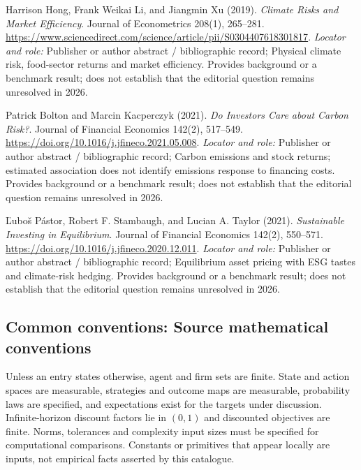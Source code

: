 \documentclass[11pt,a4paper]{article}
\begin{document}
\begin{enumerate}[label={[S\arabic*]},leftmargin=*]

\item Harrison Hong, Frank Weikai Li, and Jiangmin Xu (2019). \emph{Climate Risks and Market Efficiency}. Journal of Econometrics 208(1), 265–281. \url{https://www.sciencedirect.com/science/article/pii/S0304407618301817}.
\textit{Locator and role:} Publisher or author abstract / bibliographic record; Physical climate risk, food-sector returns and market efficiency. Provides background or a benchmark result; does not establish that the editorial question remains unresolved in 2026.

\item Patrick Bolton and Marcin Kacperczyk (2021). \emph{Do Investors Care about Carbon Risk?}. Journal of Financial Economics 142(2), 517–549. \url{https://doi.org/10.1016/j.jfineco.2021.05.008}.
\textit{Locator and role:} Publisher or author abstract / bibliographic record; Carbon emissions and stock returns; estimated association does not identify emissions response to financing costs. Provides background or a benchmark result; does not establish that the editorial question remains unresolved in 2026.

\item Ľuboš Pástor, Robert F. Stambaugh, and Lucian A. Taylor (2021). \emph{Sustainable Investing in Equilibrium}. Journal of Financial Economics 142(2), 550–571. \url{https://doi.org/10.1016/j.jfineco.2020.12.011}.
\textit{Locator and role:} Publisher or author abstract / bibliographic record; Equilibrium asset pricing with ESG tastes and climate-risk hedging. Provides background or a benchmark result; does not establish that the editorial question remains unresolved in 2026.

\end{enumerate}

\subsection*{Common conventions: Source mathematical conventions}

Unless an entry states otherwise, agent and firm sets are finite. State and action spaces are measurable, strategies and outcome maps are measurable, probability laws are specified, and expectations exist for the targets under discussion. Infinite-horizon discount factors lie in $(0,1)$ and discounted objectives are finite. Norms, tolerances and complexity input sizes must be specified for computational comparisons. Constants or primitives that appear locally are inputs, not empirical facts asserted by this catalogue.
\end{document}
